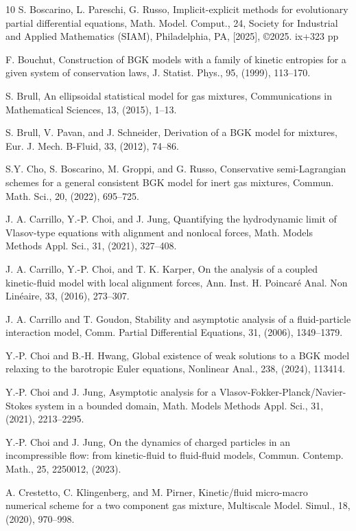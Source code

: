 \documentclass[10pt,reqno]{amsart}
\numberwithin{equation}{section}
\begin{document}
\begin{thebibliography}{10}
 S. Boscarino, L. Pareschi, G. Russo, Implicit-explicit methods for evolutionary partial differential equations, Math. Model. Comput., 24, Society for Industrial and Applied Mathematics (SIAM), Philadelphia, PA, [2025], \copyright 2025. ix+323 pp

 F. Bouchut, Construction of BGK models with a family of kinetic entropies for a given system of conservation laws, J. Statist. Phys., 95, (1999), 113--170.

 
	 S. Brull,  An ellipsoidal statistical model for gas mixtures, Communications in Mathematical Sciences, 13, (2015), 1--13.
	
	S. Brull, V. Pavan, and J. Schneider,  Derivation of a BGK model for mixtures, Eur. J. Mech. B-Fluid, 33, (2012), 74--86.
	
S.Y. Cho, S. Boscarino, M. Groppi, and G. Russo, Conservative semi-Lagrangian schemes for a general
consistent BGK model for inert gas mixtures, Commun. Math. Sci., 20, (2022), 695--725.

 J. A. Carrillo, Y.-P. Choi, and J. Jung, Quantifying the hydrodynamic limit of Vlasov-type equations with alignment and nonlocal forces, Math. Models Methods Appl. Sci., 31, (2021), 327--408.

 J. A. Carrillo, Y.-P. Choi, and T. K. Karper, On the analysis of a coupled kinetic-fluid model with local alignment forces, Ann. Inst. H. Poincar\'e Anal. Non Lin\'eaire, 33, (2016), 273--307.

 J. A. Carrillo and T. Goudon, Stability and asymptotic analysis of a fluid-particle interaction model, Comm. Partial Differential Equations, 31, (2006), 1349--1379.


 

 Y.-P. Choi and B.-H. Hwang, Global existence of weak solutions to a BGK model relaxing to the barotropic Euler equations, Nonlinear Anal., 238, (2024), 113414. 
 
 Y.-P. Choi and J. Jung, Asymptotic analysis for a Vlasov-Fokker-Planck/Navier-Stokes system in a bounded domain, Math. Models Methods Appl. Sci., 31, (2021), 2213--2295.


 Y.-P. Choi and J. Jung, On the dynamics of charged particles in an incompressible flow: from kinetic-fluid to fluid-fluid models, Commun. Contemp. Math., 25, 2250012, (2023).

A. Crestetto, C. Klingenberg, and M. Pirner, Kinetic/fluid micro-macro numerical scheme for a two
 component gas mixture, Multiscale Model. Simul., 18, (2020), 970--998.




\end{thebibliography}
\end{document}
